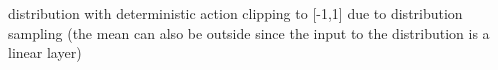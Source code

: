 



distribution with deterministic
action clipping to [-1,1] due to distribution sampling
(the mean can also be outside since the input to the distribution is a linear layer)

